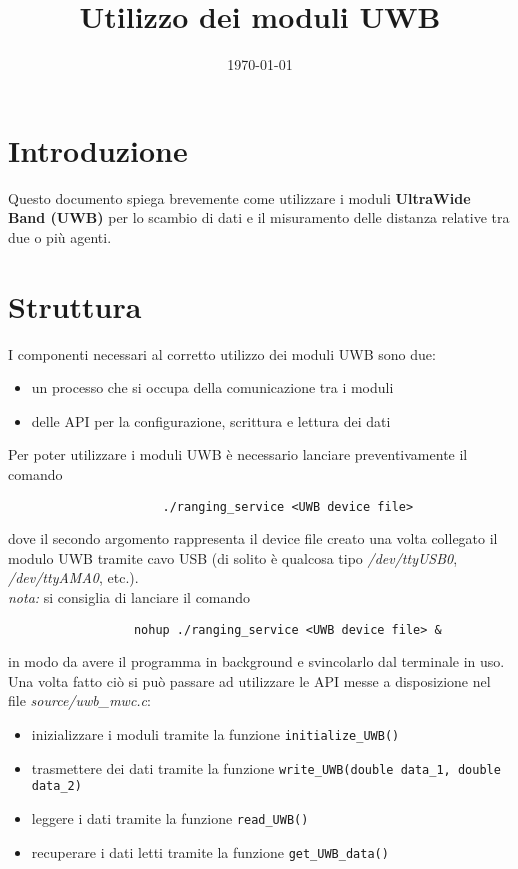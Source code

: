 \documentclass[a4paper, 12pt, titlepage]{article}
\date{\Large{\today}}
\title{\huge{Utilizzo dei moduli UWB}}
\numberwithin{equation}{section}
\numberwithin{figure}{section}
\begin{document}
\maketitle
\setlength{\abovedisplayskip}{3mm}
\setlength{\belowdisplayskip}{3mm}
\newpage

\section{Introduzione}
    Questo documento spiega brevemente come utilizzare i moduli \textbf{UltraWide Band (UWB)} per lo scambio di dati e il misuramento delle distanza relative tra due o più agenti.
\section{Struttura}
    I componenti necessari al corretto utilizzo dei moduli UWB sono due:
    \begin{itemize}
        \item{un processo che si occupa della comunicazione tra i moduli}
        \item{delle API per la configurazione, scrittura e lettura dei dati}
    \end{itemize}
    Per poter utilizzare i moduli UWB è necessario lanciare preventivamente il comando
    \vspace{0.5em}
    \begin{figure}[h]
        \begin{BVerbatim}
                ./ranging_service <UWB device file>
        \end{BVerbatim}
    \end{figure}
    dove il secondo argomento rappresenta il device file creato una volta collegato il modulo UWB tramite cavo USB (di solito è qualcosa tipo \textit{/dev/ttyUSB0}, \textit{/dev/ttyAMA0}, etc.). \\ [1em]
    \textit{nota:} si consiglia di lanciare il comando
    \vspace{0.5em}
    \begin{figure}[h]
        \begin{BVerbatim}
            nohup ./ranging_service <UWB device file> &
        \end{BVerbatim}
    \end{figure}
    \noindent
    \newline
    in modo da avere il programma in background e svincolarlo dal terminale in uso. \\[2em]
    \noindent
    Una volta fatto ciò si può passare ad utilizzare le API messe a disposizione nel file \textit{source/uwb\_mwc.c}:
    \begin{itemize}
        \item{inizializzare i moduli tramite la funzione \texttt{initialize\_UWB()}}
        \item{trasmettere dei dati tramite la funzione \texttt{write\_UWB(double data\_1, double data\_2)}}
        \item{leggere i dati tramite la funzione \texttt{read\_UWB()}}
        \item{recuperare i dati letti tramite la funzione \texttt{get\_UWB\_data()}}
    \end{itemize}
    \vspace{2em}
    \newpage
\end{document}
